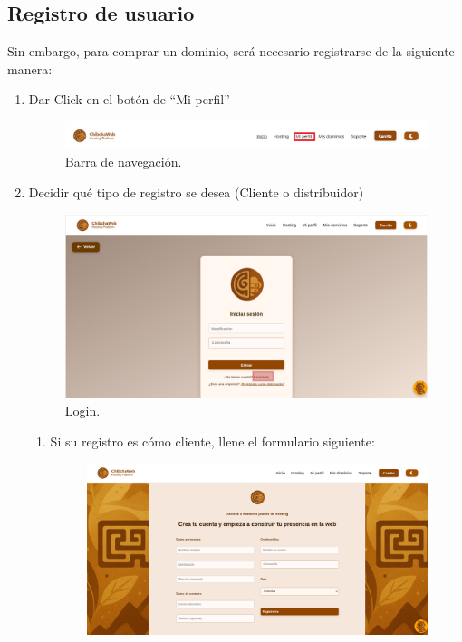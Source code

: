 \subsection{Registro de usuario }
Sin embargo, para comprar un dominio, será necesario registrarse de la siguiente manera:

\begin{enumerate}
	\item Dar Click en el botón de “Mi perfil”
	\begin{figure}[H]
		\includegraphics[width=\columnwidth]{acceso/navbar-perfil.png}
		\caption{Barra de navegación.}
		\label{fig:navbar-perfil}
	\end{figure}
	\item Decidir qué tipo de registro se desea (Cliente o distribuidor)
   	\begin{figure}[H]
        \centering
  		\includegraphics[width=\columnwidth]{acceso/login-registro.png}
  		\caption{Login.}
  		\label{fig:login-registrol}
   	\end{figure}
    \begin{enumerate}
        \item Si su registro es cómo cliente, llene el formulario siguiente:
        \begin{figure}[H]
            \centering
      		\includegraphics[width=\columnwidth]{acceso/registro-cliente.png}

\end{figure}
\end{enumerate}
\end{enumerate}
